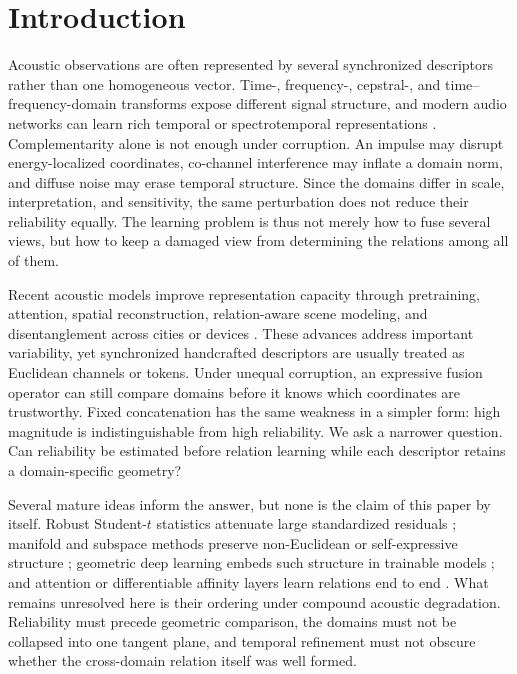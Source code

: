 \section{Introduction}

Acoustic observations are often represented by several synchronized descriptors rather than one homogeneous vector. Time-, frequency-, cepstral-, and time--frequency-domain transforms expose different signal structure, and modern audio networks can learn rich temporal or spectrotemporal representations \citep{cakir2017crnn,kong2020panns,gong2021ast}. Complementarity alone is not enough under corruption. An impulse may disrupt energy-localized coordinates, co-channel interference may inflate a domain norm, and diffuse noise may erase temporal structure. Since the domains differ in scale, interpretation, and sensitivity, the same perturbation does not reduce their reliability equally. The learning problem is thus not merely how to fuse several views, but how to keep a damaged view from determining the relations among all of them.

Recent acoustic models improve representation capacity through pretraining, attention, spatial reconstruction, relation-aware scene modeling, and disentanglement across cities or devices \citep{hou2024cooperative,yang2024spatial,tan2024disentanglement}. These advances address important variability, yet synchronized handcrafted descriptors are usually treated as Euclidean channels or tokens. Under unequal corruption, an expressive fusion operator can still compare domains before it knows which coordinates are trustworthy. Fixed concatenation has the same weakness in a simpler form: high magnitude is indistinguishable from high reliability. We ask a narrower question. Can reliability be estimated before relation learning while each descriptor retains a domain-specific geometry?

Several mature ideas inform the answer, but none is the claim of this paper by itself. Robust Student-$t$ statistics attenuate large standardized residuals \citep{lange1989student}; manifold and subspace methods preserve non-Euclidean or self-expressive structure \citep{roweis2000lle,tenenbaum2000isomap,vidal2011subspace}; geometric deep learning embeds such structure in trainable models \citep{bronstein2017gdl,chakraborty2022manifoldnet}; and attention or differentiable affinity layers learn relations end to end \citep{vaswani2017attention,velickovic2018gat,ji2017dsc}. What remains unresolved here is their ordering under compound acoustic degradation. Reliability must precede geometric comparison, the domains must not be collapsed into one tangent plane, and temporal refinement must not obscure whether the cross-domain relation itself was well formed.

